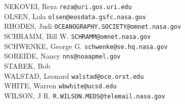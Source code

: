 \begin{latexonly}
\begin{tabbing}
NEKOVEI, Reza \> {\tt reza@uri.gos.uri.edu  } \\
OLSEN, Lola \> {\tt olsen@eosdata.gsfc.nasa.gov} \\
RHODES, Judi \> {\tt OCEANOGRAPHY.SOCIETY@omnet.nasa.gov} \\
SCHRAMM, Bill W.\> {\tt SCHRAMM@omnet.nasa.gov} \\
SCHWENKE, George G.\> {\tt schwenke@se.hq.nasa.gov} \\
SOREIDE, Nancy \> {\tt nns@noaapmel.gov} \\
STAREK, Bob \\
WALSTAD, Leonard \> {\tt walstad@oce.orst.edu} \\
WHITE, Warren \> {\tt wbwhite@ucsd.edu} \\
WILSON, J R. \> {\tt R.WILSON.MEDS@telemail.nasa.gov}
\end{tabbing}

\end{latexonly}

\newpage

